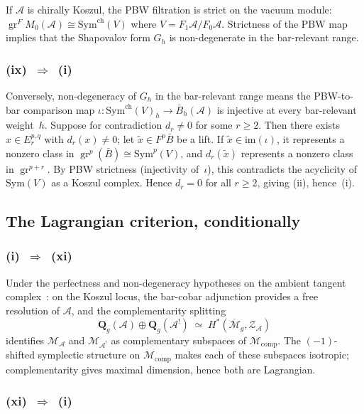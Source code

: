 \documentclass[11pt,reqno]{amsart}
\theoremstyle{definition}
\theoremstyle{remark}
\newcommand{\cA}{\mathcal{A}}
\newcommand{\cM}{\mathcal{M}}
\newcommand{\cZ}{\mathcal{Z}}
\newcommand{\barB}{\bar{B}}
\newcommand{\Sym}{\mathrm{Sym}}
\newcommand{\Symch}{\mathrm{Sym}^{\mathrm{ch}}}
\DeclareMathOperator{\gr}{gr}
\numberwithin{equation}{section}
\begin{document}
If $\cA$ is chirally Koszul, the PBW filtration is strict on the
vacuum module: $\gr^F M_0(\cA) \cong \Symch(V)$ where
$V = F_1\cA/F_0\cA$. Strictness of the PBW map implies that the
Shapovalov form $G_h$ is non-degenerate in the bar-relevant range.

\subsubsection*{\textup{(ix)}~$\Rightarrow$~\textup{(i)}}

Conversely, non-degeneracy of $G_h$ in the bar-relevant range
means the PBW-to-bar comparison map
$\iota\colon\Symch(V)_h\to\barB_h(\cA)$ is injective at every
bar-relevant weight~$h$. Suppose for contradiction $d_r \neq 0$
for some $r \ge 2$. Then there exists
$x\in E_r^{p,q}$ with $d_r(x)\neq 0$; let $\tilde x\in F^p\barB$
be a lift. If $\tilde x\in\mathrm{im}(\iota)$, it represents a
nonzero class in $\gr^p(\barB)\cong \Sym^p(V)$, and
$d_r(\tilde x)$ represents a nonzero class in $\gr^{p+r}$. By
PBW strictness (injectivity of~$\iota$), this contradicts the
acyclicity of $\Sym(V)$ as a Koszul complex. Hence $d_r = 0$ for
all $r\ge 2$, giving (ii), hence~(i).

\subsection{The Lagrangian criterion, conditionally}

\subsubsection*{\textup{(i)}~$\Rightarrow$~\textup{(xi)}}

Under the perfectness and non-degeneracy hypotheses on the
ambient tangent complex~\cite[Prop.~6.3]{LorgatMKD1}: on the
Koszul locus, the bar-cobar adjunction provides a free resolution
of $\cA$, and the complementarity splitting
\[
\mathbf{Q}_g(\cA) \oplus \mathbf{Q}_g(\cA^!)
 \;\simeq\; H^*(\overline{\cM}_g, \cZ_\cA)
\]
identifies $\cM_\cA$ and $\cM_{\cA^!}$ as complementary subspaces
of $\cM_{\mathrm{comp}}$. The $(-1)$-shifted symplectic structure
on $\cM_{\mathrm{comp}}$ makes each of these subspaces isotropic;
complementarity gives maximal dimension, hence both are
Lagrangian.

\subsubsection*{\textup{(xi)}~$\Rightarrow$~\textup{(i)}}
\end{document}
